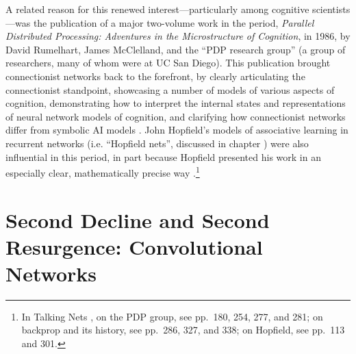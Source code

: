 A related reason for this renewed interest---particularly among cognitive scientists---was the publication of a major two-volume work in the period, {\em Parallel Distributed Processing: Adventures in the Microstructure of Cognition}, in 1986, by David Rumelhart, James McClelland, and the ``PDP research group'' (a group of researchers, many of whom were at UC San Diego).  This publication brought connectionist networks back to the forefront, by clearly articulating the connectionist standpoint, showcasing a number of models of various aspects of cognition, demonstrating how to interpret the internal states and representations of neural network models of cognition, and clarifying how connectionist networks differ from symbolic AI models \cite{rumelhart1986parallel}. John Hopfield's models of associative learning in recurrent networks (i.e. ``Hopfield nets'', discussed in chapter ) were also influential in this period, in part because Hopfield presented his work in an especially clear, mathematically precise way \cite{hopfield1982neural}.\footnote{In Talking Nets \cite{anderson2000talking}, on the PDP group, see pp.~180, 254, 277, and 281; on backprop and its history, see pp.~286, 327, and 338; on Hopfield, see pp.~113 and 301.}



\section{Second Decline and Second Resurgence: Convolutional Networks}\label{deep_revolution}

